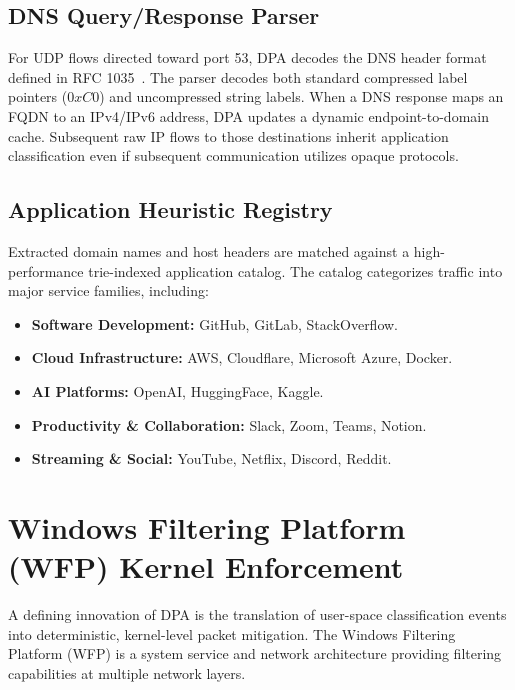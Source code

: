 \documentclass[conference]{IEEEtran}
\begin{document}
\subsection{DNS Query/Response Parser}
For UDP flows directed toward port 53, DPA decodes the DNS header format defined in RFC 1035~\cite{mockapetris1987domain}. The parser decodes both standard compressed label pointers ($0xC0$) and uncompressed string labels. When a DNS response maps an FQDN to an IPv4/IPv6 address, DPA updates a dynamic endpoint-to-domain cache. Subsequent raw IP flows to those destinations inherit application classification even if subsequent communication utilizes opaque protocols.

\subsection{Application Heuristic Registry}
Extracted domain names and host headers are matched against a high-performance trie-indexed application catalog. The catalog categorizes traffic into major service families, including:
\begin{itemize}
    \item \textbf{Software Development:} GitHub, GitLab, StackOverflow.
    \item \textbf{Cloud Infrastructure:} AWS, Cloudflare, Microsoft Azure, Docker.
    \item \textbf{AI Platforms:} OpenAI, HuggingFace, Kaggle.
    \item \textbf{Productivity \& Collaboration:} Slack, Zoom, Teams, Notion.
    \item \textbf{Streaming \& Social:} YouTube, Netflix, Discord, Reddit.
\end{itemize}

\section{Windows Filtering Platform (WFP) Kernel Enforcement}
\label{sec:wfp}
A defining innovation of DPA is the translation of user-space classification events into deterministic, kernel-level packet mitigation. The Windows Filtering Platform (WFP) is a system service and network architecture providing filtering capabilities at multiple network layers.
\end{document}
